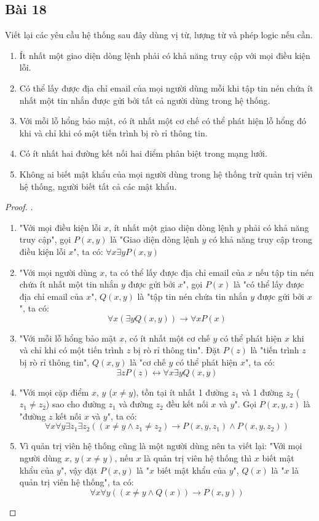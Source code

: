 \subsection*{Bài 18}
Viết lại các yêu cầu hệ thống sau đây dùng vị từ, lượng từ và phép logic nếu cần.
\begin{enumerate}[label=\alph*)]
    \item Ít nhất một giao diện dòng lệnh phải có khả năng truy cập với mọi điều kiện lỗi.
    \item Có thể lấy được địa chỉ email của mọi người dùng mỗi khi tập tin nén chứa ít nhất một tin nhắn được gửi bởi tất cả người dùng trong hệ thống.
    \item Với mỗi lỗ hổng bảo mật, có ít nhất một cơ chế có thể phát hiện lỗ hổng đó khi và chỉ khi có một tiến trình bị rò rỉ thông tin.
    \item Có ít nhất hai đường kết nối hai điểm phân biệt trong mạng lưới.
    \item Không ai biết mật khẩu của mọi người dùng trong hệ thống trừ quản trị viên hệ thống, người biết tất cả các mật khẩu.
\end{enumerate}
\begin{proof}.
    \begin{enumerate}[label=\alph*)]
        \item "Với mọi điều kiện lỗi $x$, ít nhất một giao diện dòng lệnh $y$ phải có khả năng truy cập", gọi $P(x,y)$ là "Giao diện dòng lệnh $y$ có khả năng truy cập trong điều kiện lỗi $x$", ta có: $\forall x\exists yP(x,y)$
        \item "Với mọi người dùng $x$, ta có thể lấy được địa chỉ email của $x$ nếu tập tin nén chứa ít nhất một tin nhắn $y$ được gửi bởi $x$", gọi $P(x)$ là "có thể lấy được địa chỉ email của $x$", $Q(x,y)$ là "tập tin nén chứa tin nhắn $y$ được gửi bởi $x$", ta có: $$\forall x(\exists yQ(x,y))\rightarrow \forall xP(x)$$
        \item "Với mỗi lỗ hổng bảo mật $x$, có ít nhất một cơ chế $y$ có thể phát hiện $x$ khi và chỉ khi có một tiến trình $z$ bị rò rỉ thông tin". Đặt $P(z)$ là "tiến trình $z$ bị rò rỉ thông tin", $Q(x,y)$ là "cơ chế $y$ có thể phát hiện $x$", ta có: $$\exists zP(z)\leftrightarrow \forall x\exists yQ(x,y)$$
        \item "Với mọi cặp điểm $x$, $y$ ($x\neq y$), tồn tại ít nhất 1 đường $z_1$ và 1 đường $z_2$ ($z_1\neq z_2$) sao cho đường $z_1$ và đường $z_2$ đều kết nối $x$ và $y$". Gọi $P(x,y,z)$ là "đường $z$ kết nối $x$ và $y$", ta có: $$\forall x\forall y\exists z_1\exists z_2((x\neq y\land z_1\neq z_2)\rightarrow P(x,y,z_1)\land P(x,y,z_2))$$
        \item Vì quản trị viên hệ thống cũng là một người dùng nên ta viết lại: "Với mọi người dùng $x$, $y (x\neq y)$, nếu $x$ là quản trị viên hệ thống thì $x$ biết mật khẩu của $y$", vậy đặt $P(x,y)$ là "$x$ biết mật khẩu của $y$", $Q(x)$ là "$x$ là quản trị viên hệ thống", ta có: $$\forall x\forall y((x\neq y\land Q(x))\rightarrow P(x,y))$$
    \end{enumerate}
\end{proof}
